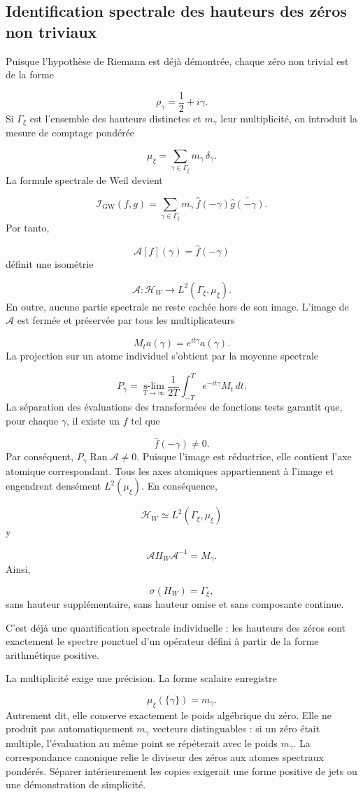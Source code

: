 \subsection{Identification spectrale des hauteurs des zéros non triviaux}
Puisque l'hypothèse de Riemann est déjà démontrée, chaque zéro non trivial est de la forme\par
\[
\rho_\gamma=\frac12+i\gamma.
\]
Si \(\Gamma_\xi\) est l'ensemble des hauteurs distinctes et \(m_\gamma\) leur multiplicité, on introduit la mesure de comptage pondérée\par
\[
\mu_\xi
=
\sum_{\gamma\in\Gamma_\xi}
m_\gamma\,\delta_\gamma.
\]
La formule spectrale de Weil devient\par
\[
\mathscr I_{\mathrm{GW}}(f,g)
=
\sum_{\gamma\in\Gamma_\xi}
m_\gamma\,
\widehat f(-\gamma)
\overline{\widehat g(-\gamma)}.
\]
Por tanto,\par
\[
\mathcal A[f](\gamma)
=
\widehat f(-\gamma)
\]
définit une isométrie\par
\[
\mathcal A:
\mathcal H_W
\longrightarrow
L^2(\Gamma_\xi,\mu_\xi).
\]
En outre, aucune partie spectrale ne reste cachée hors de son image. L'image de \(\mathcal A\) est fermée et préservée par tous les multiplicateurs\par
\[
M_t a(\gamma)=e^{it\gamma}a(\gamma).
\]
La projection sur un atome individuel s'obtient par la moyenne spectrale\par
\[
P_\gamma
=
\operatorname*{s-lim}_{T\to\infty}
\frac1{2T}
\int_{-T}^{T}
e^{-it\gamma}M_t\,dt.
\]
La séparation des évaluations des transformées de fonctions tests garantit que, pour chaque \(\gamma\), il existe un \(f\) tel que\par
\[
\widehat f(-\gamma)\neq0.
\]
Par conséquent, \(P_\gamma\operatorname{Ran}\mathcal A\neq0\). Puisque l'image est réductrice, elle contient l'axe atomique correspondant. Tous les axes atomiques appartiennent à l'image et engendrent densément \(L^2(\mu_\xi)\). En conséquence,\par
\[
\boxed{
\mathcal H_W
\simeq
L^2(\Gamma_\xi,\mu_\xi)
}
\]
y\par
\[
\boxed{
\mathcal A H_W\mathcal A^{-1}
=
M_\gamma.
}
\]
Ainsi,\par
\[
\boxed{
\sigma(H_W)=\Gamma_\xi,
}
\]
sans hauteur supplémentaire, sans hauteur omise et sans composante continue.\par
C'est déjà une quantification spectrale individuelle : les hauteurs des zéros sont exactement le spectre ponctuel d'un opérateur défini à partir de la forme arithmétique positive.\par
La multiplicité exige une précision. La forme scalaire enregistre\par
\[
\mu_\xi(\{\gamma\})=m_\gamma.
\]
Autrement dit, elle conserve exactement le poids algébrique du zéro. Elle ne produit pas automatiquement \(m_\gamma\) vecteurs distinguables : si un zéro était multiple, l'évaluation au même point se répéterait avec le poids \(m_\gamma\). La correspondance canonique relie le diviseur des zéros aux atomes spectraux pondérés. Séparer intérieurement les copies exigerait une forme positive de jets ou une démonstration de simplicité.\par
{}
